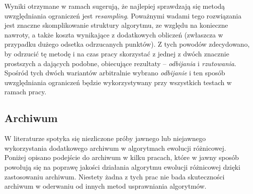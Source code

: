 \documentclass[12pt,a4paper]{report}
\begin{document}
{{{{\begin{description}
\end{description}
}
\par{
Wyniki otrzymane w ramach \cite{Boundary} sugerują, że najlepiej sprawdzają się metodą uwzględniania ograniczeń jest \emph{resampling}. Poważnymi wadami tego rozwiązania jest znaczne skomplikowanie struktury algorytmu, ze względu na konieczne nawroty, a także koszta wynikające z dodatkowych obliczeń (zwłaszcza w przypadku dużego odsetka odrzucanych punktów). Z tych powodów zdecydowano, by odrzucić tę metodę i na czas pracy skorzystać z jednej z dwóch znacznie prostszych a dających podobne, obiecujące rezultaty -- \emph{odbijania} i \emph{rzutowania}. Spośród tych dwóch wariantów arbitralnie wybrano \emph{odbijanie} i ten sposób uwzględniania ograniczeń będzie wykorzystywany przy wszystkich testach w ramach pracy.
}

\subsection{Archiwum}
\label{ArchiveLiterature}
\par{
W literaturze spotyka się niezliczone próby jawnego lub niejawnego wykorzystania dodatkowego archiwum w algorytmach ewolucji różnicowej. Poniżej opisano podejście do archiwum w kilku pracach, które w jawny sposób powołują się na poprawę jakości działania algorytmu ewolucji różnicowej dzięki zastosowaniu archiwum. Niestety żadna z tych prac nie bada skuteczności archiwum w oderwaniu od innych metod usprawniania algorytmów.
}
}}}
\end{document}
